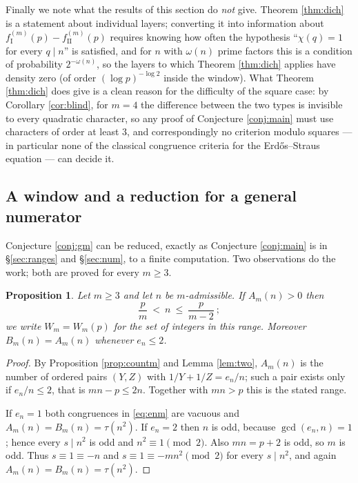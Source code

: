 \documentclass[11pt,reqno]{amsart}
\theoremstyle{plain}
\newtheorem{proposition}[theorem]{Proposition}
\theoremstyle{definition}
\numberwithin{equation}{section}
\newcommand{\fI}{f_{\mathrm{I}}}
\newcommand{\fII}{f_{\mathrm{II}}}
\begin{document}
Finally we note what the results of this section do \emph{not} give. Theorem
\ref{thm:dich} is a statement about individual layers; converting it into information
about $\fI^{(m)}(p)-\fII^{(m)}(p)$ requires knowing how often the hypothesis
``$\chi(q)=1$ for every $q\mid n$'' is satisfied, and for $n$ with $\omega(n)$ prime
factors this is a condition of probability $2^{-\omega(n)}$, so the layers to which
Theorem \ref{thm:dich} applies have density zero (of order
$(\log p)^{-\log 2}$ inside the window). What Theorem \ref{thm:dich} does give is a
clean reason for the difficulty of the square case: by Corollary \ref{cor:blind}, for
$m=4$ the difference between the two types is invisible to every quadratic character,
so any proof of Conjecture \ref{conj:main} must use characters of order at least $3$,
and correspondingly no criterion modulo squares --- in particular none of the classical
congruence criteria for the Erd\H{o}s--Straus equation --- can decide it.

\subsection{A window and a reduction for a general numerator}\label{sec:windowm}
Conjecture \ref{conj:gm} can be reduced, exactly as Conjecture \ref{conj:main} is in
\S\ref{sec:ranges} and \S\ref{sec:num}, to a finite computation. Two observations do
the work; both are proved for every $m\ge3$.

\begin{proposition}\label{prop:windowm}
Let $m\ge3$ and let $n$ be $m$-admissible. If $A_{m}(n)>0$ then
\[
  \frac pm\ <\ n\ \le\ \frac p{m-2}\ ;
\]
we write $W_{m}=W_{m}(p)$ for the set of integers in this range. Moreover
$B_{m}(n)=A_{m}(n)$ whenever $e_{n}\le2$.
\end{proposition}

\begin{proof}
By Proposition \ref{prop:countm} and Lemma \ref{lem:two}, $A_{m}(n)$ is the number of
ordered pairs $(Y,Z)$ with $1/Y+1/Z=e_{n}/n$; such a pair exists only if
$e_{n}/n\le2$, that is $mn-p\le 2n$. Together with $mn>p$ this is the stated range.

If $e_{n}=1$ both congruences in \eqref{eq:enm} are vacuous and
$A_{m}(n)=B_{m}(n)=\tau(n^{2})$. If $e_{n}=2$ then $n$ is odd, because
$\gcd(e_{n},n)=1$; hence every $s\mid n^{2}$ is odd and $n^{2}\equiv1\pmod2$. Also
$mn=p+2$ is odd, so $m$ is odd. Thus $s\equiv1\equiv-n$ and
$s\equiv1\equiv-mn^{2}\pmod 2$ for every $s\mid n^{2}$, and again
$A_{m}(n)=B_{m}(n)=\tau(n^{2})$.
\end{proof}
\end{document}
